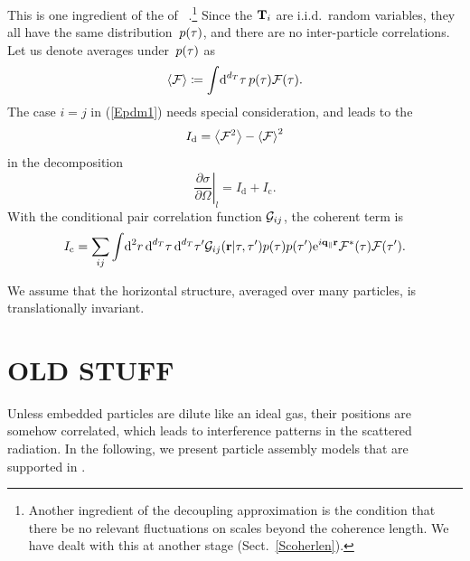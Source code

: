 This is one ingredient of the  of \IsGISAXS\
\cite[ch.~2.2.1]{Laz08}.\footnote
{Another ingredient of the decoupling approximation
is the condition that there be no relevant
fluctuations on scales beyond the coherence length.
We have dealt with this at another stage (Sect.~\ref{Scoherlen}).}
\index{Decoupling approximation}%
Since the $\mathbf{T}_i$ are i.i.d.\ random variables,
they all have the same distribution~$p(\mathbf{\tau})$,
and there are no inter-particle correlations.
Let us denote averages under~$p(\mathbf{\tau})$ as
\begin{equation}
  \left\langle\mathcal{F}\right\rangle \coloneqq  \int\!\text{d}^{d_T}\mathbf{\tau}\,p(\mathbf{\tau})\mathcal{F}(\tau).
\end{equation}
The case $i=j$ in (\ref{Epdm1}) needs special consideration,
and leads to the 
%
%
\begin{equation}
  I_\text{d} = \left\langle\mathcal{F}^2\right\rangle-{\left\langle\mathcal{F}\right\rangle}^2
\end{equation}
in the decomposition
\begin{equation}
  \left.\frac{\partial\sigma}{\partial\Omega}\right|_l
  = I_\text{d}+I_\text{c}.
\end{equation}
With the conditional pair correlation function $\mathcal{G}_{ij}$,
the coherent term is
\begin{equation}
  I_\text{c} = \sum_{ij}
  \int\!\text{d}^2r\, \text{d}^{d_T}\tau\, \text{d}^{d_T}\tau'
    \mathcal{G}_{ij}(\mathbf{r}|\mathbf{\tau},\mathbf{\tau}')p(\mathbf{\tau})p(\mathbf{\tau}')
  \text{e}^{i\mathbf{q}_{\parallel}\mathbf{r}}
    \mathcal{F}^*(\mathbf{\tau}) \mathcal{F}(\mathbf{\tau}').
\end{equation}

\MissingSection

We assume that the horizontal structure,
averaged over many particles, is translationally invariant.


\section{OLD STUFF}

Unless embedded particles are dilute like an ideal gas,
their positions are somehow correlated,
which leads to interference patterns in the scattered radiation.
In the following,
we present particle assembly models that are supported in \BornAgain.

